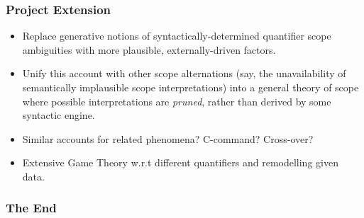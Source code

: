 \documentclass{beamer}
\begin{document}
\begin{frame}
\frametitle{Project Extension}\pause
	\begin{itemize}
		\item Replace generative notions of syntactically-determined quantifier scope ambiguities with more plausible, externally-driven factors.\pause
		\item Unify this account with other scope alternations (say, the unavailability of semantically implausible scope interpretations) into a general theory of scope where possible interpretations are \emph{pruned}, rather than derived by some syntactic engine.\pause
		\item Similar accounts for related phenomena? C-command? Cross-over?
		\item Extensive Game Theory w.r.t different quantifiers and remodelling given data.
	\end{itemize}
\end{frame}

\begin{frame}
	\frametitle{The End}
	\begin{center}
\end{center}

\end{frame}
\end{document}
